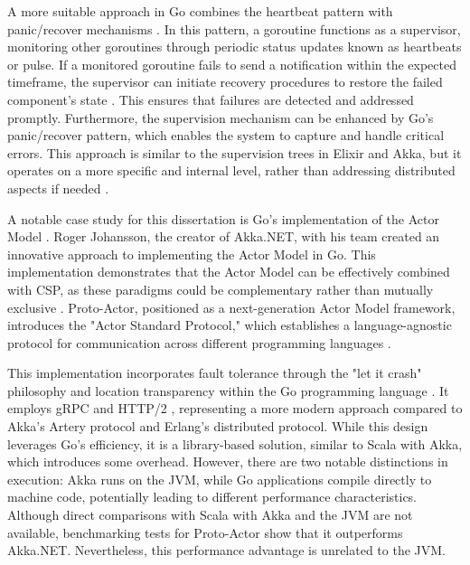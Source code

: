 A more suitable approach in Go combines the heartbeat pattern with panic/recover mechanisms \cite{Cox-Buday2017}. In this pattern, a goroutine functions as a supervisor, monitoring other goroutines through periodic status updates known as heartbeats or pulse. If a monitored goroutine fails to send a notification within the expected timeframe, the supervisor can initiate recovery procedures to restore the failed component's state \cite{Cox-Buday2017, go-docs}. This ensures that failures are detected and addressed promptly. Furthermore, the supervision mechanism can be enhanced by Go's panic/recover pattern, which enables the system to capture and handle critical errors. This approach is similar to the supervision trees in Elixir and Akka, but it operates on a more specific and internal level, rather than addressing distributed aspects if needed \cite{go-docs}.

A notable case study for this dissertation is Go's implementation of the Actor Model \cite{Whitney2019}. Roger Johansson, the creator of Akka.NET, with his team created an innovative approach to implementing the Actor Model in Go. This implementation demonstrates that the Actor Model can be effectively combined with \gls{CSP}, as these paradigms could be complementary rather than mutually exclusive \cite{proto-actor-docs}. Proto-Actor, positioned as a next-generation Actor Model framework, introduces the "Actor Standard Protocol," which establishes a language-agnostic protocol for communication across different programming languages \cite{proto-actor-docs}.

This implementation incorporates fault tolerance through the "let it crash" philosophy and location transparency within the Go programming language \cite{proto-actor-docs}. It employs gRPC and HTTP/2 \cite{proto-actor-docs}, representing a more modern approach compared to Akka’s Artery protocol and Erlang’s distributed protocol. While this design leverages Go’s efficiency, it is a library-based solution, similar to Scala with Akka, which introduces some overhead. However, there are two notable distinctions in execution: Akka runs on the JVM, while Go applications compile directly to machine code, potentially leading to different performance characteristics. Although direct comparisons with Scala with Akka and the JVM are not available, benchmarking tests for Proto-Actor show that it outperforms Akka.NET. Nevertheless, this performance advantage is unrelated to the JVM.


